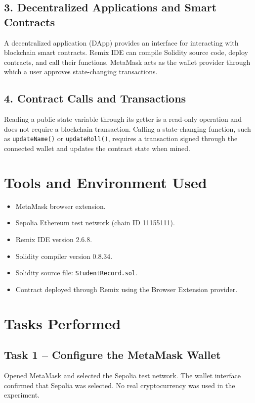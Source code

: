 \documentclass[12pt,a4paper]{article}
\begin{document}
\subsection{3. Decentralized Applications and Smart Contracts}
A decentralized application (DApp) provides an interface for interacting with blockchain smart contracts. Remix IDE can compile Solidity source code, deploy contracts, and call their functions. MetaMask acts as the wallet provider through which a user approves state-changing transactions.

\subsection{4. Contract Calls and Transactions}
Reading a public state variable through its getter is a read-only operation and does not require a blockchain transaction. Calling a state-changing function, such as \texttt{updateName()} or \texttt{updateRoll()}, requires a transaction signed through the connected wallet and updates the contract state when mined.

\section{Tools and Environment Used}
\begin{itemize}[leftmargin=1.5em]
\item MetaMask browser extension.
\item Sepolia Ethereum test network (chain ID 11155111).
\item Remix IDE version 2.6.8.
\item Solidity compiler version 0.8.34.
\item Solidity source file: \texttt{StudentRecord.sol}.
\item Contract deployed through Remix using the Browser Extension provider.
\end{itemize}

\section{Tasks Performed}
\subsection{Task 1 -- Configure the MetaMask Wallet}
Opened MetaMask and selected the Sepolia test network. The wallet interface confirmed that Sepolia was selected. No real cryptocurrency was used in the experiment.
\end{document}
